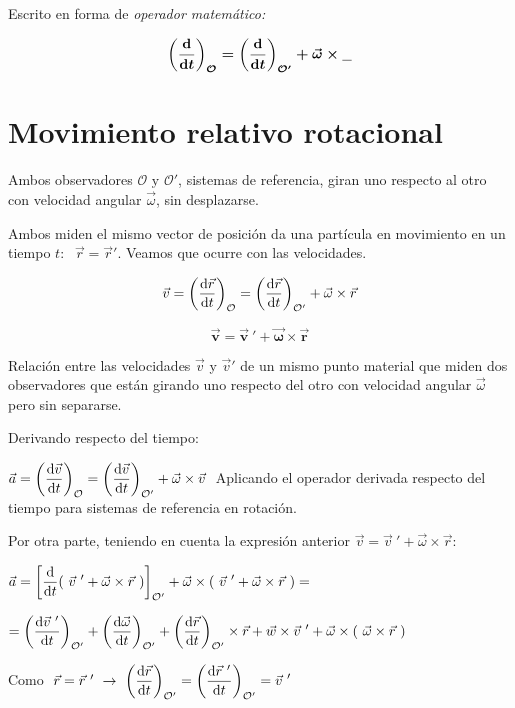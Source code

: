 Escrito en forma de \emph{operador matemático:}

$$\boldsymbol{ \left( \dv{t}\right)_{\mathcal O} =  \left( \dv{t}\right)_{\mathcal O'} + \vec \omega \times \underline{\ \ }  }$$

\section{Movimiento relativo rotacional}

Ambos observadores $\mathcal O \text{ y } \mathcal O'$, sistemas de referencia, giran uno respecto al otro con velocidad angular $\vec \omega$, sin desplazarse. 

Ambos miden el mismo vector de posición da una partícula en movimiento en un tiempo $t$: $ \ \  \vec r = \vec r'$. Veamos que ocurre con las velocidades.

$$\displaystyle \vec v = \left( \dv{\vec r}{t} \right)_{\mathcal O}=
\left( \dv{\vec r}{t} \right)_{\mathcal O'} + \vec \omega \times \vec r$$

$$ \boldsymbol{ \vec v = \vec v \ ' + \vec \omega \times \vec r } $$

Relación entre las velocidades $\vec v$ y $\vec v'$ de un mismo punto material que miden dos observadores que están girando uno respecto del otro con velocidad angular $\vec \omega$ pero sin separarse.
  
Derivando respecto del tiempo:

$\vec a = \displaystyle \left( \dv{\vec v}{t} \right)_{\mathcal O} =  \left( \dv{\vec v}{t} \right)_{\mathcal O'}+ \vec \omega \times \vec v \ $ \textcolor{gris}{ Aplicando el operador derivada respecto del tiempo para sistemas de referencia en rotación.}

Por otra parte, \textcolor{gris}{teniendo en cuenta la expresión anterior $\vec v = \vec v \ ' + \vec \omega \times \vec r$}:

$\displaystyle \vec a = \left[ \dv{t} (\  \vec v \ ' + \vec \omega \times \vec r \ ) \right]_{\mathcal O'} + \vec \omega \times (\  \vec v \ ' + \vec \omega \times \vec r \ ) = $

$\displaystyle = \left( \dv{\vec v\ '}{t} \right)_{\mathcal O'}+ \left(  \dv{\vec \omega}{t}\right)_{\mathcal O'} + \left( \dv{\vec r}{t} \right)_{\mathcal O'} \times \vec r +
\vec w \times \vec v\ ' + \vec \omega \times ( \ \vec \omega  \times  \vec r \ )$

Como $\ \vec r=\vec r\ ' \ \to \ \displaystyle \left( \dv{\vec r}{t} \right)_{\mathcal O'} =\left( \dv{\vec r \ '}{t} \right)_{\mathcal O'} = \vec v\ '$


